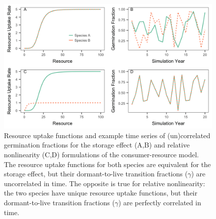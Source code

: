 \documentclass[12pt,]{article}
\begin{document}
\begin{figure}[htbp]
\centering
\includegraphics{components/figure/manuscript-model_types-1.png}
\caption{Resource uptake functions and example time series of
(un)correlated germination fractions for the storage effect (A,B) and
relative nonlinearity (C,D) formulations of the consumer-resource model.
The resource uptake functions for both species are equivalent for the
storage effect, but their dormant-to-live transition fractions
(\(\gamma\)) are uncorrelated in time. The opposite is true for relative
nonlinearity: the two species have unique resource uptake functions, but
their dormant-to-live transition fractions (\(\gamma\)) are perfectly
correlated in time.}
\end{figure}

\newpage{}
\end{document}
